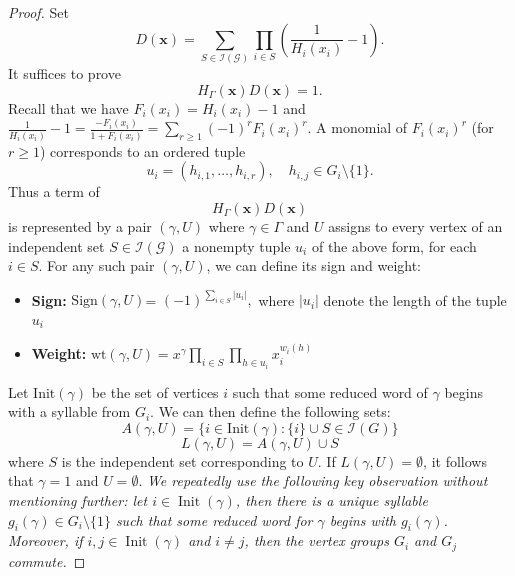 \documentclass[10pt,a4paper]{amsart}
\begin{document}
\begin{proof}
    Set
\begin{equation*}
D(\mathbf{x}) = \sum_{S \in \mathcal I(\mathcal G)} \prod_{i \in S} \left( \frac{1}{H_i(x_i)} - 1 \right).
\end{equation*}
It suffices to prove
\begin{equation*}
H_{\Gamma}(\mathbf{x})D(\mathbf{x}) = 1.
\end{equation*}
Recall that we have $F_i(x_i) = H_i(x_i) - 1$ and $\frac{1}{H_i(x_i)} - 1 = \frac{-F_i(x_i)}{1 + F_i(x_i)} = \sum_{r \ge 1} (-1)^r F_i(x_i)^r$. 
A monomial of $F_i(x_i)^r$ (for $r\ge1$) corresponds to an ordered tuple
\begin{equation*}
u_i = (h_{i,1}, \dots, h_{i,r}), \quad h_{i,j} \in G_i \setminus \{1\}.
\end{equation*}
Thus a term of
\begin{equation*}
H_{\Gamma}(\mathbf{x})D(\mathbf{x})
\end{equation*}
is represented by a pair $(\gamma, U)$ where $\gamma \in \Gamma$ and $U$ assigns to every vertex of an independent set $S \in  \mathcal I(\mathcal G)$ a nonempty tuple $u_i$ of the above form, for each $i\in S$.
For any such pair $(\gamma, U)$, we can define its sign and weight:
\begin{itemize}
    \item \textbf{Sign:} $\mathrm{Sign}(\gamma,U)$= $(-1)^{\sum_{i \in S} |u_i|},$ where $|u_i|$ denote the length of the tuple $u_i$
    \item \textbf{Weight:} $\mathrm{wt}(\gamma,U) = x^\gamma \prod_{i \in S} \prod_{h \in u_i} x_i^{w_i(h)}$
\end{itemize}


Let $\mathrm{Init}(\gamma)$ be the set of vertices $i$ such that some reduced word of $\gamma$ begins with a syllable from $G_i$. We can then define the following sets:
\begin{equation*}
A(\gamma, U) = \{i \in \mathrm{Init}(\gamma) : \{i\} \cup S \in \mathcal{I}(G)\}
\end{equation*}
\begin{equation*}
L(\gamma, U) = A(\gamma, U) \cup S
\end{equation*}
where $S$ is the independent set corresponding to $U$.
If $L(\gamma, U) = \emptyset$, it follows that $\gamma = 1$ and $U = \emptyset$. \textit{
We repeatedly use the following key observation without mentioning further:
let \(i\in \operatorname{Init}(\gamma)\), then there is a unique syllable
\(g_i(\gamma)\in G_i\setminus\{1\}\) such that some reduced word for
\(\gamma\) begins with \(g_i(\gamma)\). Moreover, if
\(i,j\in\operatorname{Init}(\gamma)\) and \(i\ne j\), then the vertex groups
\(G_i\) and \(G_j\) commute.
}



\end{proof}
\end{document}
